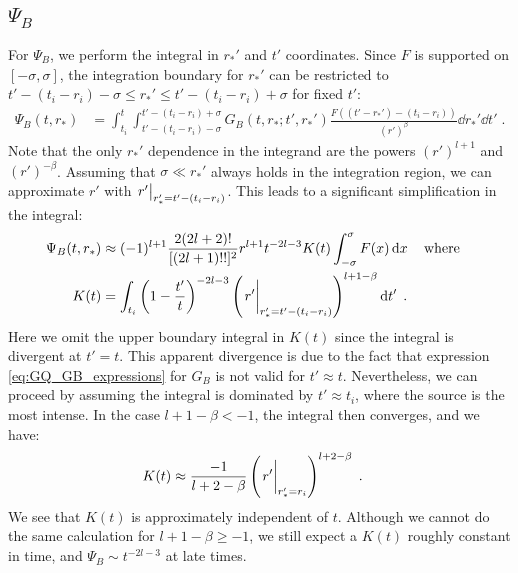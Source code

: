 \documentclass[reprint,aps,physrev,superscriptaddress,10pt,notitlepage,prd,nofootinbib,onecolumn]{revtex4-2}
\begin{document}
\subsection{$\Psi_B$}
\label{sec:Psi_B_details}
For $\Psi_B$, we perform the integral in $r_*'$ and $t'$ coordinates.
Since $F$ is supported on $[-\sigma,\sigma]$, the integration boundary for $r_*'$ can be restricted to $t'-(t_i-r_i)-\sigma \leq r_*' \leq t'-(t_i-r_i)+\sigma$ for fixed $t'$:
\begin{align}
  \Psi_B(t,r_*) &= \int_{t_i}^t \int_{t'-(t_i-r_i)-\sigma}^{t'-(t_i-r_i)+\sigma}  G_B(t,r_*;t',r_*') \frac{F((t'-r_*')-(t_i-r_i))}{(r')^\beta} \dd{r_*'} \dd{t'}  \;.
\end{align}
Note that the only $r_*'$ dependence in the integrand are the powers $(r')^{l+1}$ and $(r')^{-\beta}$.
Assuming that $\sigma \ll r_*'$ always holds in the integration region, we can approximate $r'$ with $\eval{r'}_{r_*'=t'-(t_i-r_i)}$.
This leads to a significant simplification in the integral:
\begin{align}
  \Psi_B(t,r_*) &\approx (-1)^{l+1} \frac{2(2l+2)!}{[(2l+1)!!]^2} r^{l+1} t^{-2l-3}  K(t) \int_{-\sigma}^{\sigma} F(x) \dd{x} \qq{where} \nonumber \\
  K(t) &= \int_{t_i} \left(1-\frac{t'}{t}\right)^{-2l-3} \left(\eval{r'}_{r_*'=t'-(t_i-r_i)}\right)^{l+1-\beta}   \dd{t'} \;.
\end{align}
Here we omit the upper boundary integral in $K(t)$ since the integral is divergent at $t' = t$.
This apparent divergence is due to the fact that expression \eqref{eq:GQ_GB_expressions} for $G_B$ is not valid for $t'\approx t$.
Nevertheless, we can proceed by assuming the integral is dominated by $t' \approx t_i$, where the source is the most intense.
In the case $l+1-\beta<-1$, the integral then converges, and we have:
\begin{align}
  K(t) &%
         \approx \frac{-1}{l+2-\beta} \left(\eval{r'}_{r_*'=r_i}\right)^{l+2-\beta}  \;.
\end{align}
We see that $K(t)$ is approximately independent of $t$.
Although we cannot do the same calculation for $l+1-\beta \geq -1$, we still expect a $K(t)$ roughly constant in time, and $\Psi_B \sim t^{-2l-3}$ at late times.
\end{document}
